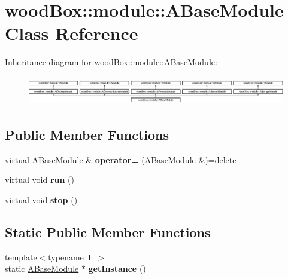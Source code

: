 \hypertarget{classwood_box_1_1module_1_1_a_base_module}{}\section{wood\+Box\+:\+:module\+:\+:A\+Base\+Module Class Reference}
\label{classwood_box_1_1module_1_1_a_base_module}
Inheritance diagram for wood\+Box\+:\+:module\+:\+:A\+Base\+Module\+:\begin{figure}[H]
\begin{center}
\leavevmode
\includegraphics[height=1.297297cm]{classwood_box_1_1module_1_1_a_base_module}
\end{center}
\end{figure}
\subsection*{Public Member Functions}
\begin{DoxyCompactItemize}
\item 
\mbox{\label{classwood_box_1_1module_1_1_a_base_module_acc424dcbb69e7928104b2c3b02e2ab1b}} 
virtual \mbox{\hyperlink{classwood_box_1_1module_1_1_a_base_module}{A\+Base\+Module}} \& {\bfseries operator=} (\mbox{\hyperlink{classwood_box_1_1module_1_1_a_base_module}{A\+Base\+Module}} \&)=delete
\item 
\mbox{\label{classwood_box_1_1module_1_1_a_base_module_a0c4aa2958534a52382fcca2dfc10cfdb}} 
virtual void {\bfseries run} ()
\item 
\mbox{\label{classwood_box_1_1module_1_1_a_base_module_a287b9d612a66557bfdc6f583c80bc814}} 
virtual void {\bfseries stop} ()
\end{DoxyCompactItemize}
\subsection*{Static Public Member Functions}
\begin{DoxyCompactItemize}
\item 
\mbox{\label{classwood_box_1_1module_1_1_a_base_module_a08ba1924981ed852924f7047f915986b}} 
{\footnotesize template$<$typename T $>$ }\\static \mbox{\hyperlink{classwood_box_1_1module_1_1_a_base_module}{A\+Base\+Module}} $\ast$ {\bfseries get\+Instance} ()
\end{DoxyCompactItemize}
